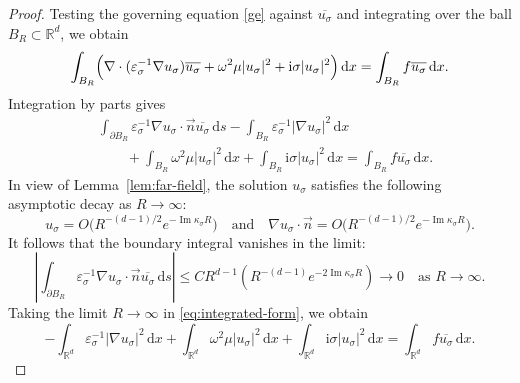 \documentclass[10pt,a4paper]{amsart}
\begin{document}
\begin{proof}
Testing the governing equation  \eqref{ge} against $\overline{u_\sigma}$ and integrating over the ball $B_R \subset \mathbb{R}^d$, we obtain
\begin{equation*}
    \int_{B_R} \Bigl(\nabla \cdot (\varepsilon_\sigma^{-1} \nabla u_\sigma)\overline{u_\sigma} + \omega^2 \mu |u_\sigma|^2 + \mathrm{i}\sigma |u_\sigma|^2\Bigr)\,\mathrm{d}x = \int_{B_R} f\overline{u_\sigma}\,\mathrm{d}x.
\end{equation*}
Integration by parts gives
\begin{align}\label{eq:integrated-form}
    &\int_{\partial B_R} \varepsilon_\sigma^{-1}\nabla u_\sigma\cdot\vec{n} \overline{u_\sigma}\,\mathrm{d}s - \int_{B_R} \varepsilon_\sigma^{-1} |\nabla u_\sigma|^2\,\mathrm{d}x  \nonumber\\
    &\qquad + \int_{B_R} \omega^2 \mu |u_\sigma|^2\,\mathrm{d}x + \int_{B_R} \mathrm{i}\sigma |u_\sigma|^2\,\mathrm{d}x = \int_{B_R} f\overline{u_\sigma}\,\mathrm{d}x.
\end{align}
In view of Lemma~\ref{lem:far-field}, the solution $u_\sigma$ satisfies the following asymptotic decay as $R \to \infty$:
\begin{equation*}
    u_\sigma = O\!\bigl(R^{-(d-1)/2}e^{-\operatorname{Im}\kappa_\sigma R}\bigr) \quad \text{and} \quad \nabla u_\sigma \cdot \vec{n} = O\!\bigl(R^{-(d-1)/2}e^{-\operatorname{Im}\kappa_\sigma R}\bigr).
\end{equation*}
It follows that the boundary integral vanishes in the limit:
\begin{equation*}
    \left| \int_{\partial B_R} \varepsilon_\sigma^{-1}\nabla u_\sigma\cdot\vec{n} \overline{u_\sigma}\,\mathrm{d}s \right| \leq C R^{d-1} \left( R^{-(d-1)} e^{-2\operatorname{Im}\kappa_\sigma R} \right) \longrightarrow 0 \quad \text{as } R \to \infty.
\end{equation*}
Taking the limit $R \to \infty$ in \eqref{eq:integrated-form}, we obtain
\begin{equation}\label{eq:limit-equation}
    -\int_{\mathbb{R}^d} \varepsilon_\sigma^{-1} |\nabla u_\sigma|^2\,\mathrm{d}x + \int_{\mathbb{R}^d} \omega^2 \mu |u_\sigma|^2\,\mathrm{d}x + \int_{\mathbb{R}^d} \mathrm{i}\sigma |u_\sigma|^2\,\mathrm{d}x = \int_{\mathbb{R}^d} f\overline{u_\sigma}\,\mathrm{d}x.
\end{equation}


\end{proof}
\end{document}
